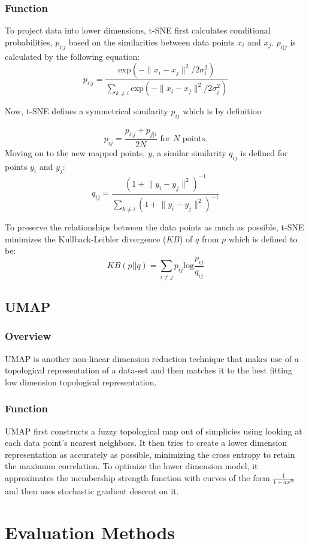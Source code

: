 \documentclass[11pt]{article}
\theoremstyle{definition}
\begin{document}
\subsubsection{Function}
To project data into lower dimensions, t-SNE first calculates conditional probabilities, $p_{i|j}$ based on the similarities between data points $x_{i}$ and $x_{j}$. $p_{i|j}$ is calculated by the following equation:
$$p_{i|j}=\frac{\text{exp}(-\lVert x_i-x_j\rVert ^2/2\sigma_i^2)}{\sum_{k\neq{i}}\text{exp}(-\lVert x_i-x_j\rVert^2/2\sigma_i^2)}$$

Now, t-SNE defines a symmetrical similarity $p_{ij}$ which is by definition

$$p_{ij}=\frac{p_{i|j}+p_{j|i}}{2N} \text{ for } N \text{ points.}$$
Moving on to the new mapped points, $y$, a similar similarity $q_{ij}$ is defined for points $y_i$ and $y_j$: 
$$q_{ij}=\frac{(1+\lVert y_i-y_j\rVert^2)^{-1}}{\sum_{k\neq{i}}(1+\lVert y_i-y_j\rVert^2)^{-1}}$$

To preserve the relationships between the data points as much as possible, t-SNE minimizes the Kullback-Leibler divergence ($KB$) of $q$ from $p$ which is defined to be: 
$$KB(p||q) = \sum_{i\neq{j}}p_{ij}\text{log}\frac{p_{ij}}{q_{ij}}$$


\subsection{UMAP}
\subsubsection{Overview}
UMAP is another non-linear dimension reduction technique that makes use of a topological representation of a data-set and then matches it to the best fitting low dimension topological representation. 

\subsubsection{Function}
UMAP first constructs a fuzzy topological map out of simplicies using looking at each data point's nearest neighbors. It then tries to create a lower dimension representation as accurately as possible, minimizing the cross entropy to retain the maximum correlation. To optimize the lower dimension model, it approximates the membership strength function with curves of the form $\frac{1}{1+ax^{2b}}$ and then uses stochastic gradient descent on it. 

\section{Evaluation Methods}
\end{document}
